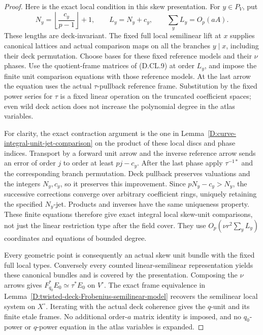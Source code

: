 \begin{proof}
Here is the exact local condition in this skew
presentation. For \(y\in P_V\), put
\[
 N_y=\left\lfloor\frac{c_y}{p-1}\right\rfloor+1,
 \qquad L_y=N_y+c_y,
 \qquad \sum_y L_y=O_p(aA).
                                                        \tag{D.GS.16}
\]
These lengths are deck-invariant.
The fixed full local semilinear lift at \(x\)
supplies canonical lattices and actual comparison
maps on all the branches \(y\mid x\), including
their deck permutation. Choose bases for these
fixed reference models and their \(\nu\) phases.
Use the quotient-frame matrices of (D.CL.9) at
order \(L_y\), and impose the finite unit
comparison equations with those reference models.
At the last arrow the equation uses the actual
\(\tau\)-pullback reference frame. Substitution
by the fixed power series for \(\tau\) is a fixed
linear operation on the truncated coefficient
spaces; even wild deck action does not increase
the polynomial degree in the atlas variables.

For clarity, the exact contraction argument is
the one in Lemma~\ref{D:curve-integral-unit-jet-comparison}
on the product of these local discs and phase
indices. Transport by a forward unit arrow and
the inverse reference arrow sends an error of
order \(j\) to order at least \(pj-c_y\).
After the last phase apply \(\tau^{-1*}\) and
the corresponding branch permutation.
Deck pullback preserves valuations and the
integers \(N_y,c_y\), so it preserves this
improvement. Since \(pN_y-c_y>N_y\), the
successive corrections converge over arbitrary
coefficient rings, uniquely retaining the
specified \(N_y\)-jet. Products and inverses
have the same uniqueness property. These finite
equations therefore give exact integral local
skew-unit comparisons, not just the linear
restriction type after the field cover.
They use \(O_p(\nu r^2\sum_y L_y)\)
coordinates and equations of bounded degree.

Every geometric point is consequently an actual
skew unit bundle with the fixed full local types.
Conversely every counted linear-semilinear
representation yields these canonical bundles
and is covered by the presentation.
Composing the \(\nu\) arrows gives
\(F_{q_0}^*E_0\simeq\tau^*E_0\) on \(V^\circ\).
The exact frame equivalence in
Lemma~\ref{D:twisted-deck-Frobenius-semilinear-model}
recovers the semilinear local system on \(X^\circ\).
Iterating with the actual deck coherence gives
the \(q\)-unit and its finite etale frames.
No additional order-\(a\) matrix identity is
imposed, and no \(q_0\)-power or \(q\)-power
equation in the atlas variables is expanded.


\end{proof}
